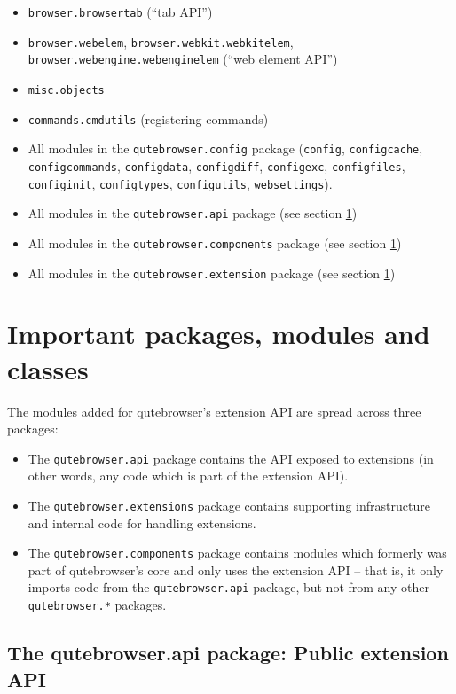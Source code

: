 \documentclass[a4paper,parskip=full,DIV=14,BCOR=15mm]{scrreprt}
\begin{document}
\begin{itemize}
  \item \verb|browser.browsertab| (``tab API'')
  \item \verb|browser.webelem|, \verb|browser.webkit.webkitelem|,
    \verb|browser.webengine.webenginelem| (``web element API'')
  \item \verb|misc.objects|
  \item \verb|commands.cmdutils| (registering commands)
  \item All modules in the \verb|qutebrowser.config| package (\verb|config|, \verb|configcache|,
    \verb|configcommands|, \verb|configdata|, \verb|configdiff|,
    \verb|configexc|, \verb|configfiles|, \verb|configinit|, \verb|configtypes|,
    \verb|configutils|, \verb|websettings|).
  \item All modules in the \verb|qutebrowser.api| package (see section \ref{sec:important})
  \item All modules in the \verb|qutebrowser.components| package (see section \ref{sec:important})
  \item All modules in the \verb|qutebrowser.extension| package (see section \ref{sec:important})
\end{itemize}


\section{Important packages, modules and classes}
\label{sec:important}
The modules added for qutebrowser's extension API are spread across three
packages:

\begin{itemize}
\item The \verb|qutebrowser.api| package contains the API exposed to
  extensions (in other words, any code which is part of the extension API).
\item The \verb|qutebrowser.extensions| package contains supporting infrastructure and
  internal code for handling extensions.
\item The \verb|qutebrowser.components| package contains modules which formerly
was part of qutebrowser's core and only uses the extension API -- that is, it
only imports code from the \verb|qutebrowser.api| package, but not from any
other \verb|qutebrowser.*| packages.
\end{itemize}

\subsection[The qutebrowser.api package]{The qutebrowser.api package: Public extension API}
\end{document}
